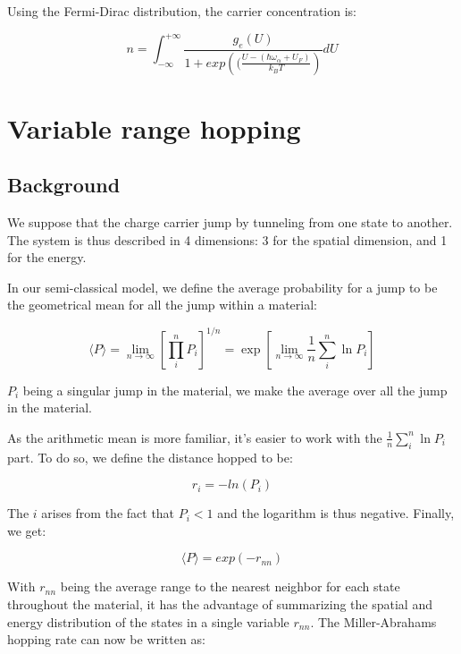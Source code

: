 Using the Fermi-Dirac distribution, the carrier concentration is:

\begin{equation}
    n = \int_{-\infty}^{+\infty}\frac{g_e(U)}{1 + exp\left((\frac{U - (\hbar \omega_\alpha + U_F)}{k_BT}\right)}d U
\end{equation}

\section{Variable range hopping}

\subsection{Background}
We suppose that the charge carrier jump by tunneling from one state to another. The system is thus described in 4 dimensions: 3 for the spatial dimension, and 1 for the energy.

In our semi-classical model, we define the average probability for a jump to be the geometrical mean for all the jump within a material:

\begin{equation}
    \langle P \rangle = \operatorname{lim}_{n \rightarrow \infty}\left[\prod_{i}^{n} P_{i}\right]^{1 / n}=\exp \left[\operatorname{lim}_{n \rightarrow \infty} \frac{1}{n} \sum_{i}^{n} \ln P_{i}\right]
\end{equation}

$P_i$ being a singular jump in the material, we make the average over all the jump in the material.

As the arithmetic mean is more familiar, it's easier to work with the $\frac{1}{n} \sum_{i}^{n} \ln P_{i}$ part. To do so, we define the distance hopped to be:

\begin{equation}
    r_i = -ln(P_i)
\end{equation}

The $i$ arises from the fact that $P_i < 1$ and the logarithm is thus negative. Finally, we get:

\begin{equation}
    \langle P \rangle = exp(-r_{nn})
\end{equation}

With $r_{nn}$ being the average range to the nearest neighbor for each state throughout the material, it has the advantage of summarizing the spatial and energy distribution of the states in a single variable $r_{nn}$. The Miller-Abrahams hopping rate can now be written as:

